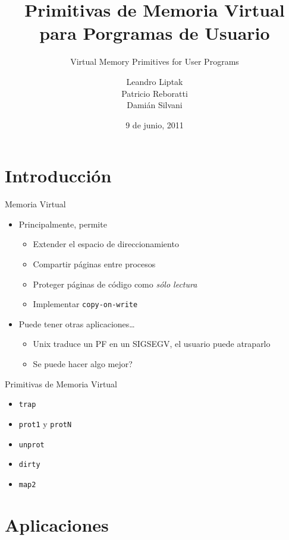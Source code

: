 \documentclass[xcolor=pdftex,dvipsnames,usenames,table]{beamer}
\title[]
{Primitivas de Memoria Virtual para Porgramas de Usuario}
\subtitle
{Virtual Memory Primitives for User Programs}
\author[]
{
	Leandro Liptak\\
	Patricio Reboratti\\
	Damián Silvani
}
\institute[UBA]
{
  Programación de Sistemas Operativos\\
  Universidad de Buenos Aires
}
\date
{9 de junio, 2011}
\begin{document}
\begin{frame}
  \titlepage
\end{frame}

\section{Introducción}

\begin{frame}{Memoria Virtual}
  \begin{itemize}
    \item Principalmente, permite
      \begin{itemize}
        \item Extender el espacio de direccionamiento
        \item Compartir páginas entre procesos
        \item Proteger páginas de código como \textit{sólo lectura}
        \item Implementar \texttt{copy-on-write}
      \end{itemize}

    \item Puede tener otras aplicaciones\ldots
    \begin{itemize}
      \item Unix traduce un PF en un SIGSEGV, el usuario puede atraparlo
      \item Se puede hacer algo mejor?
    \end{itemize}
 \end{itemize}
\end{frame}

\begin{frame}{Primitivas de Memoria Virtual}
  \begin{itemize}
    \item \texttt{trap}
    \item \texttt{prot1} y \texttt{protN}
    \item \texttt{unprot}
    \item \texttt{dirty}
    \item \texttt{map2}
  \end{itemize}
\end{frame}

\section{Aplicaciones}
\end{document}

